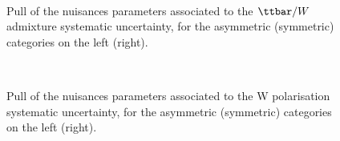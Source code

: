 \begin{figure}[tbhp]
    \caption{ Pull of the nuisances parameters associated to the $\ttbar/W$ admixture systematic uncertainty, 
      for the asymmetric (symmetric) categories on the left (right).
      \label{fig:nuisPull_tt_W_admixture}}
  \begin{center}
     ~~
  \end{center}
\end{figure}


\begin{figure}[tbhp]
    \caption{ Pull of the nuisances parameters associated to the W polarisation systematic uncertainty, 
      for the asymmetric (symmetric) categories on the left (right).
      \label{fig:nuisPull_WPol}}
  \begin{center}
     ~~
  \end{center}
\end{figure}


